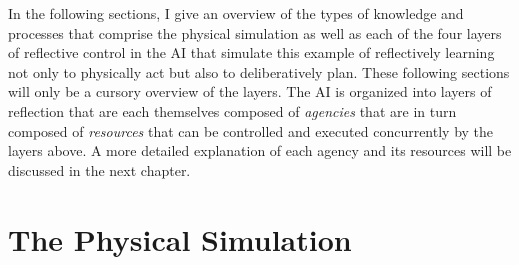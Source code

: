 In the following sections, I give an overview of the types of
knowledge and processes that comprise the physical simulation as well
as each of the four layers of reflective control in the AI that
simulate this example of reflectively learning not only to physically
act but also to deliberatively plan.  These following sections will
only be a cursory overview of the layers.  The AI is organized into
layers of reflection that are each themselves composed of
\emph{agencies} that are in turn composed of \emph{resources} that can
be controlled and executed concurrently by the layers above.  A more
detailed explanation of each agency and its resources will be
discussed in the next chapter.

\section{The Physical Simulation}

